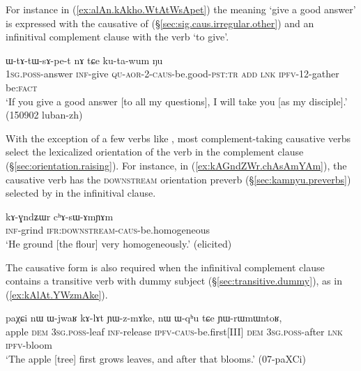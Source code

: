 For instance in (\ref{ex:alAn.kAkho.WtAtWsApet}) the meaning `give a good answer' is expressed with the causative  of  (§\ref{sec:sig.caus.irregular.other}) and an infinitival complement clause with the verb  `to give'.

\begin{exe}
\ex \label{ex:alAn.kAkho.WtAtWsApet}
 ɯ-tɤ-tɯ-sɤ-pe-t nɤ tɕe ku-ta-wum ŋu \\
\textsc{1sg}.\textsc{poss}-answer \textsc{inf}-give \textsc{qu}-\textsc{aor}-2-\textsc{caus}-be.good-\textsc{pst}:\textsc{tr} \textsc{add} \textsc{lnk} \textsc{ipfv}-1\fl{}2-gather be:\textsc{fact} \\
\glt `If you give a good answer [to all my questions], I will take you [as my disciple].' (150902 luban-zh)
\end{exe}

With the exception of a few verbs like , most com\-ple\-ment-taking causative verbs select the lexicalized orientation of the verb in the complement clause (§\ref{sec:orientation.raising}). For instance, in (\ref{ex:kAGndZWr.chAsAmYAm}), the causative verb  has the \textsc{downstream} orientation preverb  (§\ref{sec:kamnyu.preverbs}) selected by  in the infinitival clause.

\begin{exe}
\ex \label{ex:kAGndZWr.chAsAmYAm}
\gll kɤ-ɣndʑɯr cʰɤ-sɯ-ɤmɲɤm \\
\textsc{inf}-grind \textsc{ifr}:\textsc{downstream}-\textsc{caus}-be.homogeneous \\
\glt `He ground [the flour] very homogeneously.' (elicited)
\end{exe}

The causative form is also required when the infinitival complement clause contains a transitive verb with dummy subject (§\ref{sec:transitive.dummy}), as in (\ref{ex:kAlAt.YWzmAke}).

\begin{exe}
\ex \label{ex:kAlAt.YWzmAke}
\gll  paχɕi nɯ ɯ-jwaʁ kɤ-lɤt ɲɯ-z-mɤke, nɯ ɯ-qʰu tɕe ɲɯ-rɯmɯntoʁ, \\
apple \textsc{dem} \textsc{3sg}.\textsc{poss}-leaf \textsc{inf}-release \textsc{ipfv}-\textsc{caus}-be.first[III] \textsc{dem} \textsc{3sg}.\textsc{poss}-after \textsc{lnk} \textsc{ipfv}-bloom \\
\glt `The apple [tree] first grows leaves, and after that blooms.' (07-paXCi)
\end{exe}



